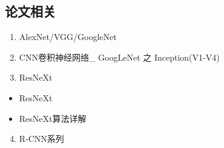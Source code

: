 \documentclass[letterpaper,10pt,english]{sphinxmanual}
\begin{document}
\subsection{论文相关}
\label{\detokenize{else/01_interview:id5}}\begin{enumerate}
\item {} 
AlexNet/VGG/GoogleNet

\end{enumerate}
\begin{quote}

\end{quote}
\begin{enumerate}
\setcounter{enumi}{1}
\item {} 
CNN卷积神经网络\_ GoogLeNet 之 Inception(V1-V4)

\end{enumerate}
\begin{quote}

\end{quote}
\begin{enumerate}
\setcounter{enumi}{2}
\item {} 
ResNeXt

\end{enumerate}
\begin{itemize}
\item {} 
ResNeXt
\begin{quote}

\end{quote}

\item {} 
ResNeXt算法详解
\begin{quote}

\end{quote}

\end{itemize}
\begin{enumerate}
\setcounter{enumi}{3}
\item {} 
R-CNN系列

\end{enumerate}
\end{document}
